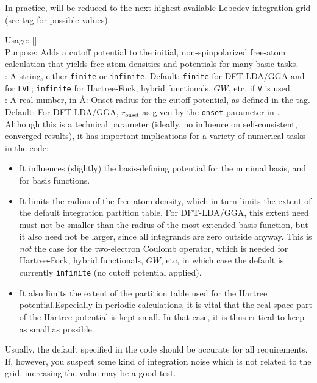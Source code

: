 In practice,  will be reduced to the next-highest
available Lebedev integration grid (see
 tag for possible values). 

{
  \noindent
  Usage:   []
    \\[1.0ex]
  Purpose: Adds a cutoff potential to the initial, non-spinpolarized
    free-atom calculation that yields free-atom densities and
    potentials for many basic tasks.\\[1.0ex]
   : A string, either \texttt{finite} or
    \texttt{infinite}. Default: \texttt{finite} for DFT-LDA/GGA and
      for  \texttt{LVL};
    \texttt{infinite} for Hartree-Fock, hybrid functionals, $GW$, etc. 
      if  \texttt{V} is used.\\
   : A real number, in {\AA}: Onset radius for the
    cutoff potential, as defined in the 
    tag. Default: For DFT-LDA/GGA, $r_\text{onset}$ as given by the
    \texttt{onset} parameter in  .\\
}
Although this is a technical parameter (ideally, no influence on
self-consistent, converged results), it has important implications for
a variety of numerical tasks in the code:
\begin{itemize}
  \item It influences (slightly) the basis-defining potential for the
    minimal basis, and for  basis
    functions.
  \item It limits the radius of the free-atom density, which in turn
    limits the extent of the default integration partition table. For
    DFT-LDA/GGA, this extent need must not be smaller than the radius
    of the most extended basis function, but it also need not be
    larger, since all integrands are zero outside anyway. This is
    \emph{not} the case for the two-electron Coulomb operator, which
    is needed for Hartree-Fock, hybrid functionals, $GW$, etc, in
    which case the default is currently \texttt{infinite} (no cutoff
    potential applied).
  \item It also limits the extent of the partition table used for the
    Hartree potential.Especially in periodic calculations, it is vital
    that the real-space part of the Hartree potential is kept
    small. In that case, it is thus critical to keep 
    as small as possible.
\end{itemize}
Usually, the default specified in the code should be accurate for all
requirements. If, however, you suspect some kind of integration noise
which is not related to the grid, increasing the
 value may be a good test. 


